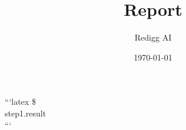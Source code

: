 \documentclass[12pt,a4paper]{article}
\title{Report}
\author{Redigg AI}
\date{\today}
\begin{document}
\maketitle

```latex
\$\\{step1.result\\}
```
\end{document}
